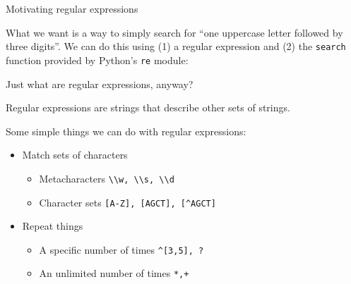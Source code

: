 \documentclass{beamer}
\begin{document}
\begin{frame}{Motivating regular expressions}

What we want is a way to simply search for ``one uppercase letter
followed by three digits''. We can do this using (1) a regular
expression and (2) the \lstinline$search$ function provided
by Python's \lstinline$re$ module:

\vspace{1em}


\end{frame}

\begin{frame}{Just what are regular expressions, anyway?}

Regular expressions are strings that describe other sets of strings.

\bigskip

Some simple things we can do with regular expressions:
\begin{itemize}
 \item Match sets of characters
 \begin{itemize}
   \item Metacharacters  \lstinline$\\w, \\s, \\d$ 
   \item Character sets  \lstinline$[A-Z], [AGCT], [^AGCT]$
 \end{itemize}
 \item Repeat things
 \begin{itemize}
   \item A specific number of times \lstinline$^[3,5], ?$
   \item An unlimited number of times \lstinline$*,+$
 \end{itemize}
\end{itemize}

\end{frame}
\end{document}
